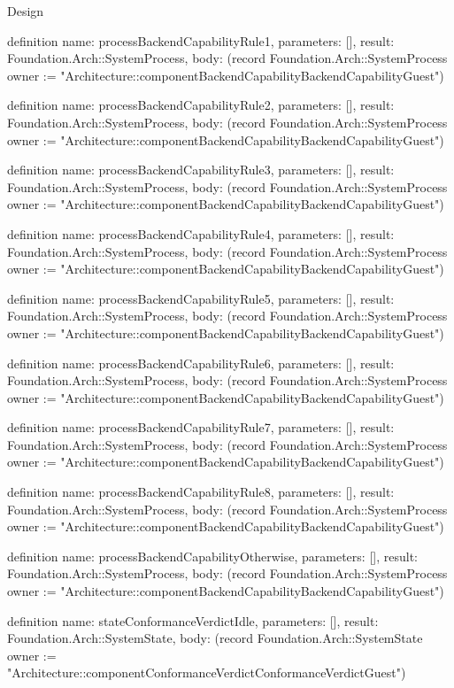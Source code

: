 \begin{lexlean}{Design}
\begin{semanticmodule}
definition{
  name: processBackendCapabilityRule1,
  parameters: [],
  result: Foundation.Arch::SystemProcess,
  body: (record Foundation.Arch::SystemProcess {owner := "Architecture::componentBackendCapabilityBackendCapabilityGuest"})
}

definition{
  name: processBackendCapabilityRule2,
  parameters: [],
  result: Foundation.Arch::SystemProcess,
  body: (record Foundation.Arch::SystemProcess {owner := "Architecture::componentBackendCapabilityBackendCapabilityGuest"})
}

definition{
  name: processBackendCapabilityRule3,
  parameters: [],
  result: Foundation.Arch::SystemProcess,
  body: (record Foundation.Arch::SystemProcess {owner := "Architecture::componentBackendCapabilityBackendCapabilityGuest"})
}

definition{
  name: processBackendCapabilityRule4,
  parameters: [],
  result: Foundation.Arch::SystemProcess,
  body: (record Foundation.Arch::SystemProcess {owner := "Architecture::componentBackendCapabilityBackendCapabilityGuest"})
}

definition{
  name: processBackendCapabilityRule5,
  parameters: [],
  result: Foundation.Arch::SystemProcess,
  body: (record Foundation.Arch::SystemProcess {owner := "Architecture::componentBackendCapabilityBackendCapabilityGuest"})
}

definition{
  name: processBackendCapabilityRule6,
  parameters: [],
  result: Foundation.Arch::SystemProcess,
  body: (record Foundation.Arch::SystemProcess {owner := "Architecture::componentBackendCapabilityBackendCapabilityGuest"})
}

definition{
  name: processBackendCapabilityRule7,
  parameters: [],
  result: Foundation.Arch::SystemProcess,
  body: (record Foundation.Arch::SystemProcess {owner := "Architecture::componentBackendCapabilityBackendCapabilityGuest"})
}

definition{
  name: processBackendCapabilityRule8,
  parameters: [],
  result: Foundation.Arch::SystemProcess,
  body: (record Foundation.Arch::SystemProcess {owner := "Architecture::componentBackendCapabilityBackendCapabilityGuest"})
}

definition{
  name: processBackendCapabilityOtherwise,
  parameters: [],
  result: Foundation.Arch::SystemProcess,
  body: (record Foundation.Arch::SystemProcess {owner := "Architecture::componentBackendCapabilityBackendCapabilityGuest"})
}

definition{
  name: stateConformanceVerdictIdle,
  parameters: [],
  result: Foundation.Arch::SystemState,
  body: (record Foundation.Arch::SystemState {owner := "Architecture::componentConformanceVerdictConformanceVerdictGuest"})
}


\end{semanticmodule}
\end{lexlean}
